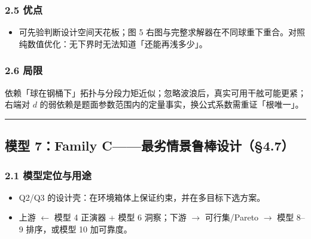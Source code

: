 \documentclass[UTF8,a4paper,zihao=-4]{ctexart}
\begin{document}
\subsubsection{\texorpdfstring{2.5 优点}{2.5 优点}}
\begin{itemize}[leftmargin=1.5em]
\item 可先验判断设计空间天花板；图 5 右图与完整求解器在不同球重下重合。对照纯数值优化：无下界时无法知道「还能再浅多少」。
\end{itemize}

\subsubsection{\texorpdfstring{2.6 局限}{2.6 局限}}
依赖「球在钢桶下」拓扑与分段力矩近似；忽略波浪后，真实可用干舷可能更紧；右端对 \(d\) 的弱依赖是题面参数范围内的定量事实，换公式系数需重证「根唯一」。

\vspace{0.4em}\hrule\vspace{0.4em}

\subsection{\texorpdfstring{模型 7：Family C------最劣情景鲁棒设计（§4.7）}{模型 7：Family C------最劣情景鲁棒设计（§4.7）}}

\subsubsection{\texorpdfstring{2.1 模型定位与用途}{2.1 模型定位与用途}}
\begin{itemize}[leftmargin=1.5em]
\item Q2/Q3 的设计壳：在环境箱体上保证约束，并在多目标下选方案。
\item 上游 $\leftarrow$ 模型 4 正演器 + 模型 6 洞察；下游 $\rightarrow$ 可行集/Pareto $\rightarrow$ 模型 8--9 排序，或模型 10 加可靠度。
\end{itemize}
\end{document}
